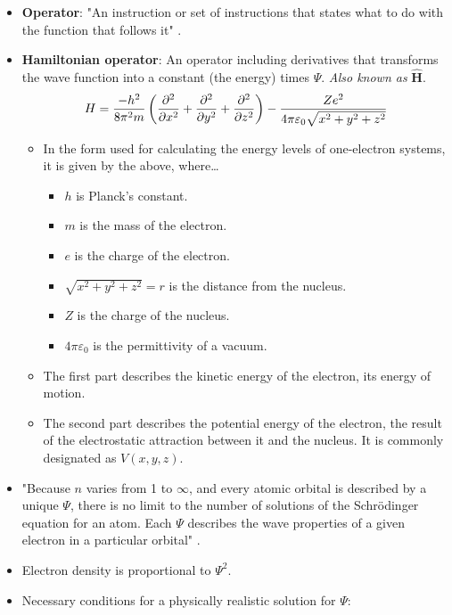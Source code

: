 \documentclass[../main.tex]{subfiles}
\begin{document}
\begin{itemize}
    \item \textbf{Operator}: "An instruction or set of instructions that states what to do with the function that follows it" \parencite[14]{bib:MiesslerFischerTarr}.
    \item \textbf{Hamiltonian operator}: An operator including derivatives that transforms the wave function into a constant (the energy) times $\Psi$. \emph{Also known as} $\bm{\hat{H}}$.
    \begin{equation*}
        H = \frac{-h^2}{8\pi^2m}\left( \pdv[2]{x}+\pdv[2]{y}+\pdv[2]{z} \right)-\frac{Ze^2}{4\pi\varepsilon_0\sqrt{x^2+y^2+z^2}}
    \end{equation*}
    \begin{itemize}
        \item In the form used for calculating the energy levels of one-electron systems, it is given by the above, where\dots
        \begin{itemize}
            \item $h$ is Planck's constant.
            \item $m$ is the mass of the electron.
            \item $e$ is the charge of the electron.
            \item $\sqrt{x^2+y^2+z^2}=r$ is the distance from the nucleus.
            \item $Z$ is the charge of the nucleus.
            \item $4\pi\varepsilon_0$ is the permittivity of a vacuum.
        \end{itemize}
        \item The first part describes the kinetic energy of the electron, its energy of motion.
        \item The second part describes the potential energy of the electron, the result of the electrostatic attraction between it and the nucleus. It is commonly designated as $V(x,y,z)$.
    \end{itemize}
    \item "Because $n$ varies from 1 to $\infty$, and every atomic orbital is described by a unique $\Psi$, there is no limit to the number of solutions of the Schr\"{o}dinger equation for an atom. Each $\Psi$ describes the wave properties of a given electron in a particular orbital" \parencite[15]{bib:MiesslerFischerTarr}.
    \item Electron density is proportional to $\Psi^2$.
    \item Necessary conditions for a physically realistic solution for $\Psi$:

\end{itemize}
\end{document}
